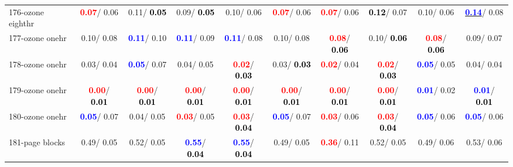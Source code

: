 \begin{table}[h]
\begin{center}
{\begin{tabular}{lc|c|c|c|c|c|c|c|c}
176-ozone eighthr & \textcolor{red}{\textbf{  0.07}}/  0.06 &   0.11/\textcolor{black}{\textbf{  0.05}} &   0.09/\textcolor{black}{\textbf{  0.05}} &   0.10/  0.06 & \textcolor{red}{\textbf{  0.07}}/  0.06 & \textcolor{red}{\textbf{  0.07}}/  0.06 & \textcolor{black}{\textbf{  0.12}}/  0.07 &   0.10/  0.06 & \underline{\textcolor{blue}{\textbf{  0.14}}}/  0.08 \\
177-ozone onehr &   0.10/  0.08 & \textcolor{blue}{\textbf{  0.11}}/  0.10 & \textcolor{blue}{\textbf{  0.11}}/  0.09 & \textcolor{blue}{\textbf{  0.11}}/  0.08 &   0.10/  0.08 & \textcolor{red}{\textbf{  0.08}}/\textcolor{black}{\textbf{  0.06}} &   0.10/\textcolor{black}{\textbf{  0.06}} & \textcolor{red}{\textbf{  0.08}}/\textcolor{black}{\textbf{  0.06}} &   0.09/  0.07 \\
178-ozone onehr &   0.03/  0.04 & \textcolor{blue}{\textbf{  0.05}}/  0.07 &   0.04/  0.05 & \textcolor{red}{\textbf{  0.02}}/\textcolor{black}{\textbf{  0.03}} &   0.03/\textcolor{black}{\textbf{  0.03}} & \textcolor{red}{\textbf{  0.02}}/  0.04 & \textcolor{red}{\textbf{  0.02}}/\textcolor{black}{\textbf{  0.03}} & \textcolor{blue}{\textbf{  0.05}}/  0.05 &   0.04/  0.04 \\
179-ozone onehr & \textcolor{red}{\textbf{  0.00}}/\textcolor{black}{\textbf{  0.01}} & \textcolor{red}{\textbf{  0.00}}/\textcolor{black}{\textbf{  0.01}} & \textcolor{red}{\textbf{  0.00}}/\textcolor{black}{\textbf{  0.01}} & \textcolor{red}{\textbf{  0.00}}/\textcolor{black}{\textbf{  0.01}} & \textcolor{red}{\textbf{  0.00}}/\textcolor{black}{\textbf{  0.01}} & \textcolor{red}{\textbf{  0.00}}/\textcolor{black}{\textbf{  0.01}} & \textcolor{red}{\textbf{  0.00}}/\textcolor{black}{\textbf{  0.01}} & \textcolor{blue}{\textbf{  0.01}}/  0.02 & \textcolor{blue}{\textbf{  0.01}}/\textcolor{black}{\textbf{  0.01}} \\
180-ozone onehr & \textcolor{blue}{\textbf{  0.05}}/  0.07 &   0.04/  0.05 & \textcolor{red}{\textbf{  0.03}}/  0.05 & \textcolor{red}{\textbf{  0.03}}/\textcolor{black}{\textbf{  0.04}} & \textcolor{blue}{\textbf{  0.05}}/  0.07 & \textcolor{red}{\textbf{  0.03}}/  0.06 & \textcolor{red}{\textbf{  0.03}}/\textcolor{black}{\textbf{  0.04}} & \textcolor{blue}{\textbf{  0.05}}/  0.06 & \textcolor{blue}{\textbf{  0.05}}/  0.06 \\
181-page blocks &   0.49/  0.05 &   0.52/  0.05 & \textcolor{blue}{\textbf{  0.55}}/\textcolor{black}{\textbf{  0.04}} & \textcolor{blue}{\textbf{  0.55}}/\textcolor{black}{\textbf{  0.04}} &   0.49/  0.05 & \textcolor{red}{\textbf{  0.36}}/  0.11 &   0.52/  0.05 &   0.49/  0.06 &   0.53/  0.06 \\ \hline

\end{tabular}}
\end{center}
\end{table}
